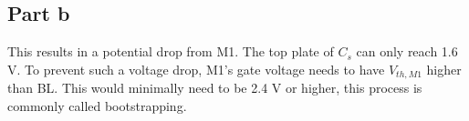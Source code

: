 \documentclass{article}
\begin{document}
\subsection*{Part b}
This results in a potential drop from M1. The top plate of $C_{s}$ can only reach 1.6 V.
To prevent such a voltage drop, M1's gate voltage needs to have $V_{th,M1}$ higher than BL.
This would minimally need to be 2.4 V or higher, this process is commonly called bootstrapping.
\end{document}
